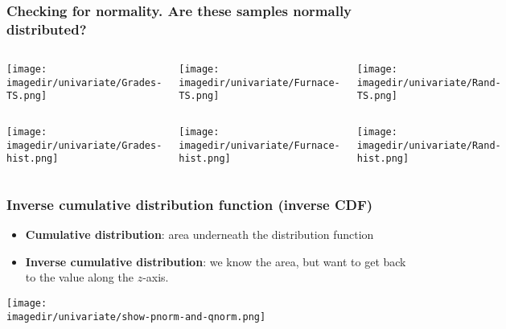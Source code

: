 \begin{frame}\frametitle{Checking for normality. Are these samples normally distributed?}
	\begin{columns}[t]
			\centerline{	\texttt{[image: \\imagedir/univariate/Grades-TS.png]}	}
			\centerline{	\texttt{[image: \\imagedir/univariate/Furnace-TS.png]}	}
			\centerline{	\texttt{[image: \\imagedir/univariate/Rand-TS.png]}	}
	\end{columns}
	\begin{columns}[t]
			\centerline{	\texttt{[image: \\imagedir/univariate/Grades-hist.png]}	}
			\centerline{	\texttt{[image: \\imagedir/univariate/Furnace-hist.png]}	}
			\centerline{	\texttt{[image: \\imagedir/univariate/Rand-hist.png]}	}
	\end{columns}
\end{frame}

\begin{frame}\frametitle{Inverse cumulative distribution function (inverse CDF)}
	\begin{itemize}
		\item	\textbf{Cumulative distribution}: area underneath the distribution function
		\item	\textbf{Inverse cumulative distribution}: we know the area, but want to get back to the value along the $z$-axis.
	\end{itemize}
	\vspace{-4pt}
	\begin{center}
		\texttt{[image: \\imagedir/univariate/show-pnorm-and-qnorm.png]}
	\end{center}
\end{frame}

